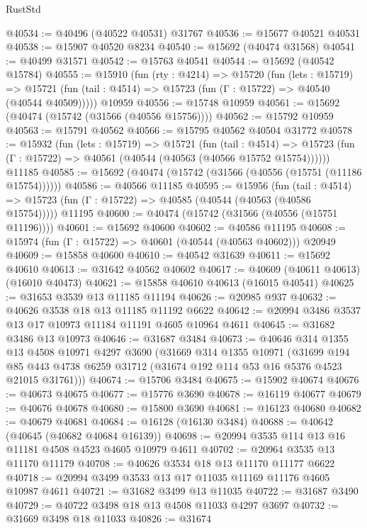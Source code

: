 \begin{lexlean}{RustStd}
\begin{coremodule}
@40534 := @40496 (@40522 @40531) @31767
@40536 := @15677 @40521 @40531
@40538 := @15907 @40520 @8234
@40540 := @15692 (@40474 @31568)
@40541 := @40499 @31571
@40542 := @15763 @40541
@40544 := @15692 (@40542 @15784)
@40555 := @15910
    (fun (rty : @4214) =>
    @15720
      (fun (lets : @15719) =>
      @15721 (fun (tail : @4514) => @15723 (fun (Γ : @15722) => @40540 (@40544 @40509)))))
    @10959
@40556 := @15748 @10959
@40561 := @15692 (@40474 (@15742 (@31566 (@40556 @15756))))
@40562 := @15792 @10959
@40563 := @15791 @40562
@40566 := @15795 @40562 @40504 @31772
@40578 := @15932
    (fun (lets : @15719) =>
    @15721
      (fun (tail : @4514) =>
      @15723 (fun (Γ : @15722) => @40561 (@40544 (@40563 (@40566 @15752 @15754))))))
    @11185
@40585 := @15692 (@40474 (@15742 (@31566 (@40556 (@15751 (@11186 @15754))))))
@40586 := @40566 @11185
@40595 := @15956
    (fun (tail : @4514) => @15723 (fun (Γ : @15722) => @40585 (@40544 (@40563 (@40586 @15754)))))
    @11195
@40600 := @40474 (@15742 (@31566 (@40556 (@15751 @11196))))
@40601 := @15692 @40600
@40602 := @40586 @11195
@40608 := @15974 (fun (Γ : @15722) => @40601 (@40544 (@40563 @40602))) @20949
@40609 := @15858 @40600
@40610 := @40542 @31639
@40611 := @15692 @40610
@40613 := @31642 @40562 @40602
@40617 := @40609 (@40611 @40613) (@16010 @40473)
@40621 := @15858 @40610 @40613 (@16015 @40541)
@40625 := @31653 @3539 @13 @11185 @11194
@40626 := @20985 @937
@40632 := @40626 @3538 @18 @13 @11185 @11192 @6622
@40642 := @20994 @3486 @3537 @13 @17 @10973 @11184 @11191 @4605 @10964 @4611
@40645 := @31682 @3486 @13 @10973
@40646 := @31687 @3484
@40673 := @40646
    @314
    @1355
    @13
    @4508
    @10971
    @4297
    @3690
    (@31669
      @314
      @1355
      @10971
      (@31699
        @194
        @85
        @443
        @4738
        @6259
        @31712
        (@31674 @192 @114 @53 @16 @5376 @4523 @21015 @31761)))
@40674 := @15706 @3484
@40675 := @15902 @40674
@40676 := @40673 @40675
@40677 := @15776 @3690
@40678 := @16119 @40677
@40679 := @40676 @40678
@40680 := @15800 @3690
@40681 := @16123 @40680
@40682 := @40679 @40681
@40684 := @16128 (@16130 @3484)
@40688 := @40642 (@40645 (@40682 @40684 @16139))
@40698 := @20994 @3535 @114 @13 @16 @11181 @4508 @4523 @4605 @10979 @4611
@40702 := @20964 @3535 @13 @11170 @11179
@40708 := @40626 @3534 @18 @13 @11170 @11177 @6622
@40718 := @20994 @3499 @3533 @13 @17 @11035 @11169 @11176 @4605 @10987 @4611
@40721 := @31682 @3499 @13 @11035
@40722 := @31687 @3490
@40729 := @40722 @3498 @18 @13 @4508 @11033 @4297 @3697
@40732 := @31669 @3498 @18 @11033
@40826 := @31674

\end{coremodule}
\end{lexlean}
